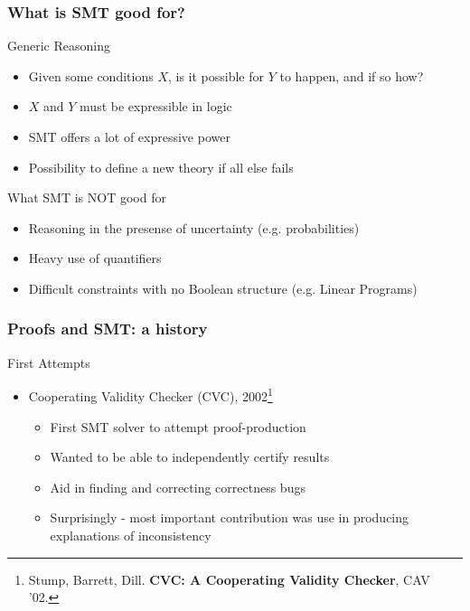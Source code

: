 \documentclass[svgnames,table,mathserif]{beamer}
\newcommand{\mth}[1]{{\color{dgreen}\ensuremath{#1}}}
\begin{document}
\begin{frame}
\frametitle{What is SMT good for?}

\begin{block}{Generic Reasoning}
\begin{itemize}
\item Given some conditions \mth{X}, is it possible for \mth{Y} to happen, and if so how?
\item \mth{X} and \mth{Y} must be expressible in logic
\item SMT offers a lot of expressive power
\item Possibility to define a new theory if all else fails
\end{itemize}
\end{block}

\begin{block}{What SMT is NOT good for}
\begin{itemize}
\item Reasoning in the presense of uncertainty (e.g. probabilities)
\item Heavy use of quantifiers
\item Difficult constraints with no Boolean structure (e.g. Linear Programs)
\end{itemize}
\end{block}

\end{frame}

\begin{frame}
  \frametitle{Proofs and SMT: a history}

\begin{block}{First Attempts}
\begin{itemize}
\item Cooperating Validity Checker (CVC), 2002\footnote{\tiny Stump, Barrett,
  Dill. {\bf CVC: A Cooperating Validity Checker}, CAV '02.}
\begin{itemize}
\item First SMT solver to attempt proof-production
\item Wanted to be able to independently certify results
\item Aid in finding and correcting correctness bugs
\item Surprisingly - most important contribution was use in producing
  explanations of inconsistency
\end{itemize}
\end{itemize}
\end{block}

\end{frame}
\end{document}
